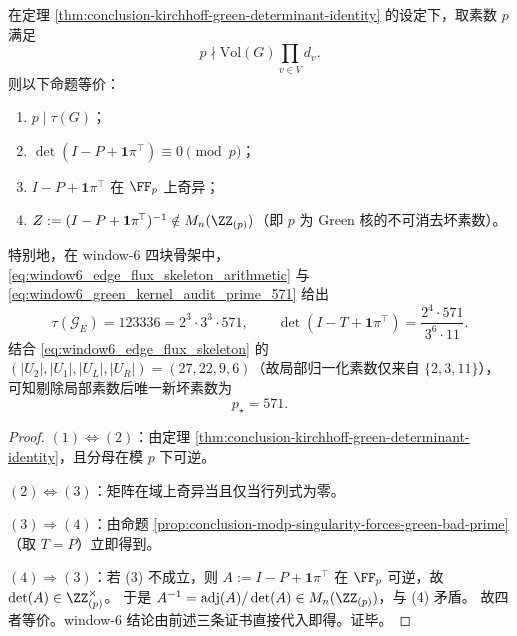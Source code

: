 \begin{corollary}\label{cor:conclusion-critical-group-torsion-green-bad-prime-equivalence}
在定理 \ref{thm:conclusion-kirchhoff-green-determinant-identity} 的设定下，取素数 \(p\) 满足
\[
p\nmid \mathrm{Vol}(G)\prod_{v\in V}d_v.
\]
则以下命题等价：
\begin{enumerate}
  \item \(p\mid \tau(G)\)；
  \item \(\det(I-P+\mathbf 1\pi^{\!\top})\equiv 0\pmod p\)；
  \item \(I-P+\mathbf 1\pi^{\!\top}\) 在 \(\FF_p\) 上奇异；
  \item \(Z:=(I-P+\mathbf 1\pi^{\!\top})^{-1}\notin M_n(\ZZ_{(p)})\)（即 \(p\) 为 Green 核的不可消去坏素数）。
\end{enumerate}
特别地，在 window-\(6\) 四块骨架中，\eqref{eq:window6_edge_flux_skeleton_arithmetic} 与 \eqref{eq:window6_green_kernel_audit_prime_571} 给出
\[
\tau(\mathcal G_E)=123336=2^3\cdot 3^3\cdot 571,\qquad
\det(I-T+\mathbf 1\pi^{\!\top})=\frac{2^4\cdot 571}{3^6\cdot 11}.
\]
结合 \eqref{eq:window6_edge_flux_skeleton} 的 \((|U_2|,|U_1|,|U_L|,|U_R|)=(27,22,9,6)\)（故局部归一化素数仅来自 \(\{2,3,11\}\)），可知剔除局部素数后唯一新坏素数为
\[
p_\star=571.
\]
\end{corollary}
\begin{proof}
\((1)\Leftrightarrow(2)\)：由定理 \ref{thm:conclusion-kirchhoff-green-determinant-identity}，且分母在模 \(p\) 下可逆。

\((2)\Leftrightarrow(3)\)：矩阵在域上奇异当且仅当行列式为零。

\((3)\Rightarrow(4)\)：由命题 \ref{prop:conclusion-modp-singularity-forces-green-bad-prime}（取 \(T=P\)）立即得到。

\((4)\Rightarrow(3)\)：若 (3) 不成立，则 \(A:=I-P+\mathbf 1\pi^{\!\top}\) 在 \(\FF_p\) 可逆，故 \(\det(A)\in \ZZ_{(p)}^\times\)。
于是
\(
A^{-1}=\operatorname{adj}(A)/\det(A)\in M_n(\ZZ_{(p)})
\)，与 (4) 矛盾。
故四者等价。window-\(6\) 结论由前述三条证书直接代入即得。证毕。
\end{proof}

